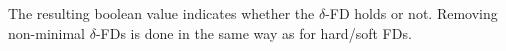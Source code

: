 \documentclass{article}
\begin{document}
    \noindent The resulting boolean value indicates whether the $\delta$-FD holds or not. Removing non-minimal $\delta$-FDs is done in the same way as for hard/soft FDs.
    
    
    
    
    
\end{document}
